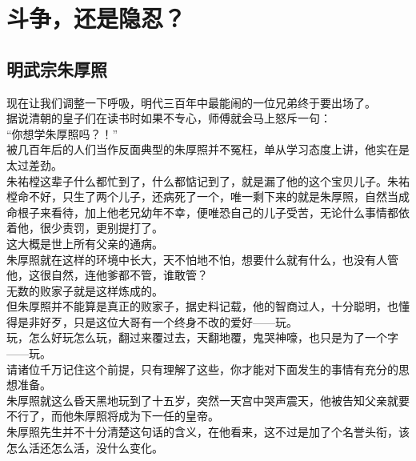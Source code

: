 \section{斗争，还是隐忍？}
\ifnum{}
	\begin{multicols}{\theparacolNo}
\fi
\subsection{明武宗朱厚照}
现在让我们调整一下呼吸，明代三百年中最能闹的一位兄弟终于要出场了。\\

据说清朝的皇子们在读书时如果不专心，师傅就会马上怒斥一句：\\

“你想学朱厚照吗？！”\\

被几百年后的人们当作反面典型的朱厚照并不冤枉，单从学习态度上讲，他实在是太过差劲。\\

朱祐樘这辈子什么都忙到了，什么都惦记到了，就是漏了他的这个宝贝儿子。朱祐樘命不好，只生了两个儿子，还病死了一个，唯一剩下来的就是朱厚照，自然当成命根子来看待，加上他老兄幼年不幸，便唯恐自己的儿子受苦，无论什么事情都依着他，很少责罚，更别提打了。\\

这大概是世上所有父亲的通病。\\

朱厚照就在这样的环境中长大，天不怕地不怕，想要什么就有什么，也没有人管他，这很自然，连他爹都不管，谁敢管？\\

无数的败家子就是这样炼成的。\\

但朱厚照并不能算是真正的败家子，据史料记载，他的智商过人，十分聪明，也懂得是非好歹，只是这位大哥有一个终身不改的爱好——玩。\\

玩，怎么好玩怎么玩，翻过来覆过去，天翻地覆，鬼哭神嚎，也只是为了一个字——玩。\\

请诸位千万记住这个前提，只有理解了这些，你才能对下面发生的事情有充分的思想准备。\\

朱厚照就这么昏天黑地玩到了十五岁，突然一天宫中哭声震天，他被告知父亲就要不行了，而他朱厚照将成为下一任的皇帝。\\

朱厚照先生并不十分清楚这句话的含义，在他看来，这不过是加了个名誉头衔，该怎么活还怎么活，没什么变化。\\


\end{multicols}
